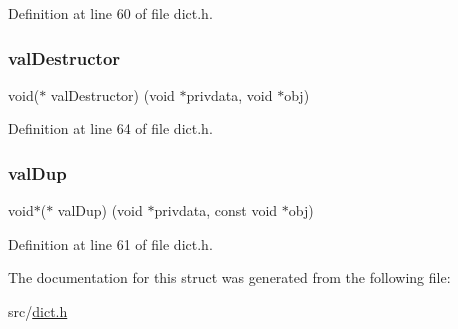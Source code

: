 Definition at line 60 of file dict.\+h.

\mbox{\label{structdict_type_adcae86192e4646f56c473a7e64fed530}} 
\subsubsection{\texorpdfstring{val\+Destructor}{valDestructor}}
{\footnotesize\ttfamily void($\ast$ val\+Destructor) (void $\ast$privdata, void $\ast$obj)}



Definition at line 64 of file dict.\+h.

\mbox{\label{structdict_type_a62279ffb4ad0b5054041285dbe54395f}} 
\subsubsection{\texorpdfstring{val\+Dup}{valDup}}
{\footnotesize\ttfamily void$\ast$($\ast$ val\+Dup) (void $\ast$privdata, const void $\ast$obj)}



Definition at line 61 of file dict.\+h.



The documentation for this struct was generated from the following file\+:\begin{DoxyCompactItemize}
\item 
src/\hyperlink{dict_8h}{dict.\+h}\end{DoxyCompactItemize}
